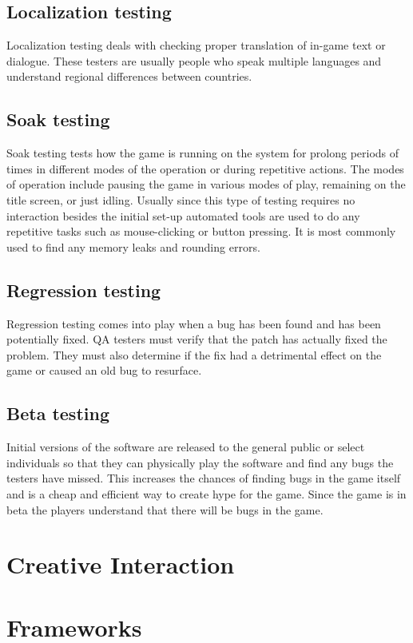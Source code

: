 \subsection{Localization testing} Localization testing deals with checking proper translation of in-game text or dialogue. These testers are usually people who speak multiple languages and understand regional differences between countries.

\subsection{Soak testing} Soak testing tests how the game is running on the system for prolong periods of times in different modes of the operation or during repetitive actions. The modes of operation include pausing the game in various modes of play, remaining on the title screen, or just idling. Usually since this type of testing requires no interaction besides the initial set-up automated tools are used to do any repetitive tasks such as mouse-clicking or button pressing. It is most commonly used to find any memory leaks and rounding errors.

\subsection{Regression testing} Regression testing comes into play when a bug has been found and has been potentially fixed. QA testers must verify that the patch has actually fixed the problem. They must also determine if the fix had a detrimental effect on the game or caused an old bug to resurface.

\subsection{Beta testing} Initial versions of the software are released to the general public or select individuals so that they can physically play the software and find any bugs the testers have missed. This increases the chances of finding bugs in the game itself and is a cheap and efficient way to create hype for the game. Since the game is in beta the players understand that there will be bugs in the game.

\section{Creative Interaction}

\section{Frameworks}

